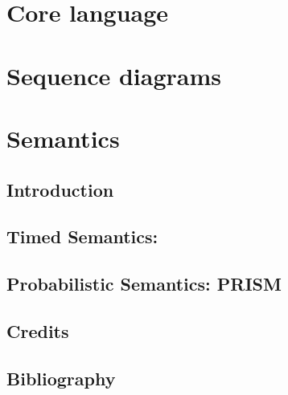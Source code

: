 \documentclass[11pt]{book}
\begin{document}
\mainmatter

\part{Core language}


\part{Sequence diagrams}


\part{Semantics}

\chapter{Introduction}\label{cha:semantics-intro}


\chapter{Timed Semantics: \tockcsp}\label{cha:semantics-tockcsp}


\chapter{Probabilistic Semantics: PRISM}\label{cha:sem-prism}
%

\appendix

\stopcontents

\chapter*{Credits}\label{cha:credits}


\chapter*{Bibliography}
\printbibliography[heading=bibempty]
\end{document}
